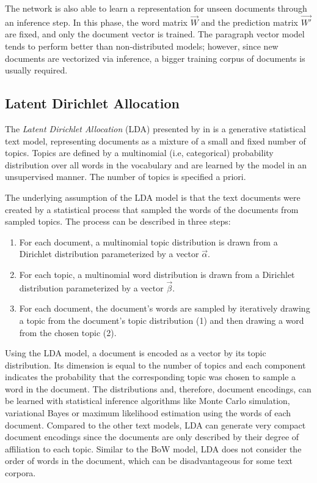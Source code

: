 The network is also able to learn a representation for unseen documents through an inference step.
In this phase, the word matrix $\vec{W}$ and the prediction matrix $\vec{W'}$ are fixed, and only the document vector is trained.
The paragraph vector model tends to perform better than non-distributed models; however, since new documents are vectorized via inference, a bigger training corpus of documents is usually required.

\subsection{Latent Dirichlet Allocation}\label{sec:lda}

The \textit{Latent Dirichlet Allocation} (LDA) presented by \citeauthor{DBLP:journals/jmlr/BleiNJ03} in \citeyear{DBLP:journals/jmlr/BleiNJ03} \cite{DBLP:journals/jmlr/BleiNJ03} is a generative statistical text model, representing documents as a mixture of a small and fixed number of topics.
Topics are defined by a multinomial (i.e, categorical) probability distribution over all words in the vocabulary and are learned by the model in an unsupervised manner.
The number of topics is specified a priori.

The underlying assumption of the LDA model is that the text documents were created by a statistical process that sampled the words of the documents from sampled topics.
The process can be described in three steps:
\begin{enumerate}
	\item For each document, a multinomial topic distribution is drawn from a Dirichlet distribution parameterized by a vector $\vec{\alpha}$.
	\item For each topic, a multinomial word distribution is drawn from a Dirichlet distribution parameterized by a vector $\vec{\beta}$.
	\item For each document, the document's words are sampled by iteratively drawing a topic from the document’s topic distribution (1) and then drawing a word from the chosen topic (2).
\end{enumerate}
Using the LDA model, a document is encoded as a vector by its topic distribution.
Its dimension is equal to the number of topics and each component indicates the probability that the corresponding topic was chosen to sample a word in the document.
The distributions and, therefore, document encodings, can be learned with statistical inference algorithms like Monte Carlo simulation, variational Bayes or maximum likelihood estimation using the words of each document.
Compared to the other text models, LDA can generate very compact document encodings since the documents are only described by their degree of affiliation to each topic.
Similar to the BoW model, LDA does not consider the order of words in the document, which can be disadvantageous for some text corpora.

